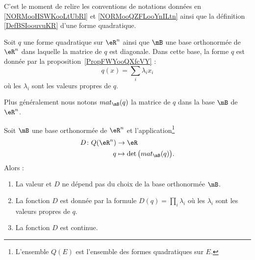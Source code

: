 C'est le moment de relire les conventions de notations données en \ref{NORMooHSWKooLtUbRl} et \ref{NORMooQZFLooYnILtn} ainsi que la définition \ref{DefBSIoouvuKR} d'une forme quadratique.

Soit \( q\) une forme quadratique sur \( \eR^n\) ainsi que \( \mB\) une base orthonormée de \( \eR^n\) dans laquelle la matrice de  \( q\) est diagonale. Dans cette base, la forme \( q\) est donnée par la proposition~\ref{PropFWYooQXfcVY} :
\begin{equation}
    q(x)=\sum_i\lambda_ix_i
\end{equation}
où les \( \lambda_i\) sont les valeurs propres de \( q\).

Plus généralement nous notons \( mat_{\mB}(q)\) la matrice de \( q\) dans la base \( \mB\) de \( \eR^n\).

\begin{proposition} \label{PropOXWooYrDKpw}
    Soit \( \mB\) une base orthonormée de \( \eR^n\) et l'application\footnote{L'ensemble \( Q(E)\) est l'ensemble des formes quadratiques sur \( E\).}
    \begin{equation}
        \begin{aligned}
            D\colon Q(\eR^n)&\to \eR \\
            q&\mapsto \det\big( mat_{\mB}(q) \big) .
        \end{aligned}
    \end{equation}
    Alors :
    \begin{enumerate}
        \item
            La valeur et \( D\) ne dépend pas du choix de la base orthonormée \( \mB\).
        \item
            La fonction \( D\) est donnée par la formule \( D(q)=\prod_i\lambda_i\) où les \( \lambda_i\) sont les valeurs propres de \( q\).
        \item
            La fonction \( D\) est continue.
    \end{enumerate}
\end{proposition}

